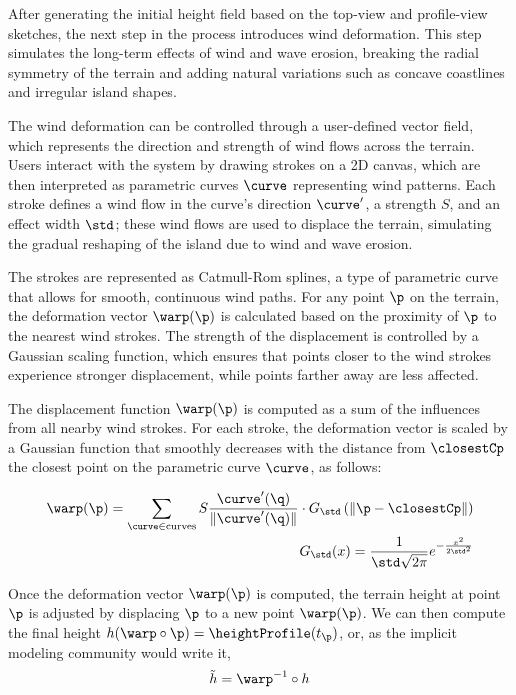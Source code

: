 After generating the initial height field based on the top-view and profile-view sketches, the next step in the process introduces wind deformation. This step simulates the long-term effects of wind and wave erosion, breaking the radial symmetry of the terrain and adding natural variations such as concave coastlines and irregular island shapes.

The wind deformation can be controlled through a user-defined vector field, which represents the direction and strength of wind flows across the terrain. Users interact with the system by drawing strokes on a 2D canvas, which are then interpreted as parametric curves $\curve$ representing wind patterns. Each stroke defines a wind flow in the curve's direction $\curve'$, a strength $S$, and an effect width $\std$; these wind flows are used to displace the terrain, simulating the gradual reshaping of the island due to wind and wave erosion.

The strokes are represented as Catmull-Rom splines, a type of parametric curve that allows for smooth, continuous wind paths. For any point $\p$ on the terrain, the deformation vector $\warp(\p)$ is calculated based on the proximity of $\p$ to the nearest wind strokes. The strength of the displacement is controlled by a Gaussian scaling function, which ensures that points closer to the wind strokes experience stronger displacement, while points farther away are less affected.

The displacement function $\warp(\p)$ is computed as a sum of the influences from all nearby wind strokes. For each stroke, the deformation vector is scaled by a Gaussian function that smoothly decreases with the distance from $\closestCp$ the closest point on the parametric curve $\curve$, as follows:

\begin{align}
    \warp(\p) = \sum_{\curve \in \text{curves}} S \frac{\curve'(\q)}{\| \curve'(\q) \| } \cdot G_\std\left(\| \p - \closestCp \| \right) %
    \\
    G_\std(x) = \frac{1}{\std \sqrt{2\pi}} e^{-\frac{x^2}{2 \std^2}}
\end{align}

Once the deformation vector $\warp(\p)$ is computed, the terrain height at point $\p$ is adjusted by displacing $\p$ to a new point $\warp(\p)$.
We can then compute the final height $h(\warp \circ \p) = \heightProfile(t_{\p})$, or, as the implicit modeling community would write it, 
\begin{align}
    \Tilde{h} = \warp^{-1} \circ h
\end{align}

